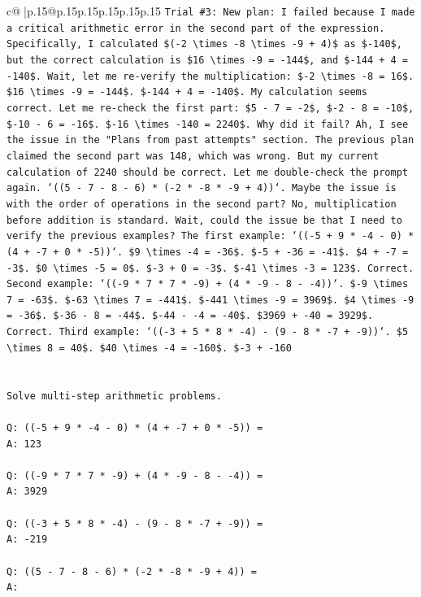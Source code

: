 \documentclass{article}
\begin{document}
{\begin{supertabular}{c@{$\;$}|p{.15\linewidth}@{}p{.15\linewidth}p{.15\linewidth}p{.15\linewidth}p{.15\linewidth}p{.15\linewidth}}
{{{\texttt{Trial \#3: New plan: I failed because I made a critical arithmetic error in the second part of the expression. Specifically, I calculated \$({-}2 \textbackslash{}times {-}8 \textbackslash{}times {-}9 + 4)\$ as \${-}140\$, but the correct calculation is \$16 \textbackslash{}times {-}9 = {-}144\$, and \${-}144 + 4 = {-}140\$. Wait, let me re{-}verify the multiplication: \${-}2 \textbackslash{}times {-}8 = 16\$. \$16 \textbackslash{}times {-}9 = {-}144\$. \${-}144 + 4 = {-}140\$. My calculation seems correct. Let me re{-}check the first part: \$5 {-} 7 = {-}2\$, \${-}2 {-} 8 = {-}10\$, \${-}10 {-} 6 = {-}16\$. \${-}16 \textbackslash{}times {-}140 = 2240\$. Why did it fail? Ah, I see the issue in the "Plans from past attempts" section. The previous plan claimed the second part was 148, which was wrong. But my current calculation of 2240 should be correct. Let me double{-}check the prompt again. `((5 {-} 7 {-} 8 {-} 6) * ({-}2 * {-}8 * {-}9 + 4))`. Maybe the issue is with the order of operations in the second part? No, multiplication before addition is standard. Wait, could the issue be that I need to verify the previous examples? The first example: `(({-}5 + 9 * {-}4 {-} 0) * (4 + {-}7 + 0 * {-}5))`. \$9 \textbackslash{}times {-}4 = {-}36\$. \${-}5 + {-}36 = {-}41\$. \$4 + {-}7 = {-}3\$. \$0 \textbackslash{}times {-}5 = 0\$. \${-}3 + 0 = {-}3\$. \${-}41 \textbackslash{}times {-}3 = 123\$. Correct. Second example: `(({-}9 * 7 * 7 * {-}9) + (4 * {-}9 {-} 8 {-} {-}4))`. \${-}9 \textbackslash{}times 7 = {-}63\$. \${-}63 \textbackslash{}times 7 = {-}441\$. \${-}441 \textbackslash{}times {-}9 = 3969\$. \$4 \textbackslash{}times {-}9 = {-}36\$. \${-}36 {-} 8 = {-}44\$. \${-}44 {-} {-}4 = {-}40\$. \$3969 + {-}40 = 3929\$. Correct. Third example: `(({-}3 + 5 * 8 * {-}4) {-} (9 {-} 8 * {-}7 + {-}9))`. \$5 \textbackslash{}times 8 = 40\$. \$40 \textbackslash{}times {-}4 = {-}160\$. \${-}3 + {-}160} \\
\\ 
\\ 
\texttt{Solve multi{-}step arithmetic problems.} \\
\\ 
\texttt{Q: (({-}5 + 9 * {-}4 {-} 0) * (4 + {-}7 + 0 * {-}5)) =} \\
\texttt{A: 123} \\
\\ 
\texttt{Q: (({-}9 * 7 * 7 * {-}9) + (4 * {-}9 {-} 8 {-} {-}4)) =} \\
\texttt{A: 3929} \\
\\ 
\texttt{Q: (({-}3 + 5 * 8 * {-}4) {-} (9 {-} 8 * {-}7 + {-}9)) =} \\
\texttt{A: {-}219} \\
\\ 
\texttt{Q: ((5 {-} 7 {-} 8 {-} 6) * ({-}2 * {-}8 * {-}9 + 4)) =} \\
\texttt{A:} \\
            }
        }
    }
     \\ \\


\end{supertabular}}
\end{document}

